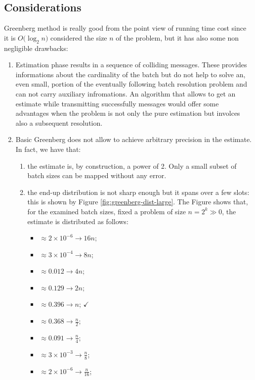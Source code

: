 \documentclass[11pt,a4paper,twoside,openright]{book}
\begin{document}
\subsection{Considerations}
Greenberg method is really good from the point view of running time cost since it is $O\bigl(\log_{2}n\bigr)$ considered the size  $n$ of the problem, but it has also some non negligible drawbacks:
\begin{enumerate}[\bf a)]
\item Estimation phase results in a sequence of colliding messages. These provides informations about the cardinality of the batch but do not help to solve an, even small, portion of the eventually following batch resolution problem and can not carry auxiliary infromations. An algorithm that allows to get an estimate while transmitting successfully messages would offer some advantages when the problem is not only the pure estimation but involces also a subsequent resolution.
\item Basic Greenberg does not allow to achieve arbitrary precision in the estimate. In fact, we have that:
	\begin{enumerate}[\it i.]
		\item  the estimate is, by construction, a power of 2. Only a small subset of batch sizes can be mapped without any error.
		\item the end-up distribution is not sharp enough but it spans over a few slots: this is shown by Figure \ref{fig:greenberg-dist-large}. The Figure shows that, for the examined batch sizes, fixed a problem of size $n=2^{k}\gg 0$, the estimate is distributed as follows:
		\begin{itemize}
		\item $\approx 2\times10^{-6} \to 16n$;
		\item $\approx 3\times10^{-4}  \to 8n$;
		\item $\approx0.012  \to 4n$;
		\item $\approx0.129 \to 2n$;
		\item $\approx0.396 \to n$; $\checkmark$
		\item $\approx0.368 \to \frac{n}{2}$;
		\item $\approx0.091\to \frac{n}{4}$;
		\item $\approx 3\times10^{-3} \to \frac{n}{8}$;
		\item $\approx 2\times10^{-6} \to \frac{n}{16}$;

\end{itemize}
\end{enumerate}
\end{enumerate}
\end{document}
